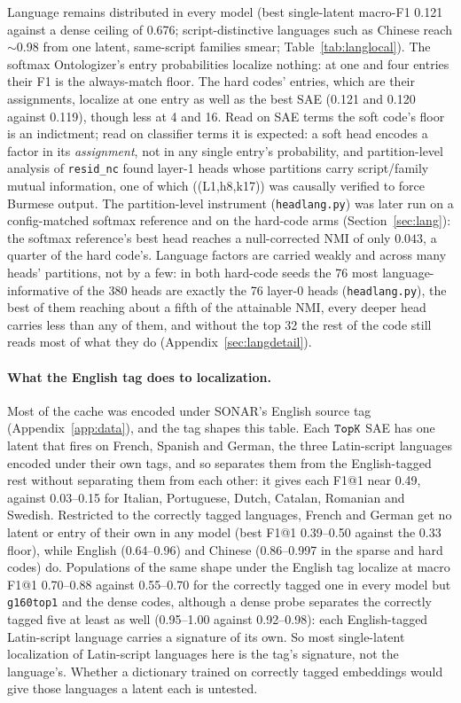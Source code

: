 Language remains distributed in every model (best single-latent macro-F1
0.121 against a dense ceiling of 0.676; script-distinctive languages such
as Chinese reach $\sim$0.98 from one latent, same-script families smear;
Table~\ref{tab:langlocal}). The softmax Ontologizer's entry probabilities
localize nothing: at one and four entries their F1 is the always-match
floor. The hard codes' entries, which are their assignments, localize at
one entry as well as the best SAE (0.121 and 0.120 against 0.119), though
less at 4 and 16. Read on SAE terms the soft code's floor is an
indictment; read on classifier terms it is expected: a soft head encodes
a factor in its \emph{assignment}, not in any single entry's probability, and partition-level
analysis of \texttt{resid\_nc} found layer-1 heads whose partitions carry
script/family mutual information, one of which ((L1,h8,k17)) was causally
verified to force Burmese output. The partition-level instrument
(\texttt{headlang.py}) was later run on a config-matched softmax
reference and on the hard-code arms (Section~\ref{sec:lang}): the softmax
reference's best head reaches a null-corrected NMI of only $0.043$, a
quarter of the hard code's. Language factors are carried weakly and
across many heads' partitions, not by a few: in both hard-code seeds the
76 most language-informative of the 380 heads are exactly the 76 layer-0
heads (\texttt{headlang.py}), the best of them reaching about a fifth of
the attainable NMI, every deeper head carries less than any of them, and
without the top 32 the rest of the code still reads most of what they do
(Appendix~\ref{sec:langdetail}).

\paragraph{What the English tag does to localization.} Most of the
cache was encoded under SONAR's English source tag
(Appendix~\ref{app:data}), and the tag shapes this table. Each $\mathop{\mathtt{TopK}}\limits$
SAE has one latent that fires on French, Spanish and German, the three
Latin-script languages encoded under their own tags, and so separates
them from the English-tagged rest without separating them from each
other: it gives each F1@1 near 0.49, against 0.03--0.15 for Italian,
Portuguese, Dutch, Catalan, Romanian and Swedish. Restricted to the
correctly tagged languages, French and German get no latent or entry of
their own in any model (best F1@1 0.39--0.50 against the 0.33 floor),
while English (0.64--0.96) and Chinese (0.86--0.997 in the sparse and
hard codes) do. Populations of the same shape under the English tag
localize at macro F1@1 0.70--0.88 against 0.55--0.70 for the correctly
tagged one in every model but \texttt{g160top1} and the dense codes,
although a dense probe separates the correctly tagged five at least as
well (0.95--1.00 against 0.92--0.98): each English-tagged Latin-script
language carries a signature of its own. So most single-latent
localization of Latin-script languages here is the tag's signature, not
the language's. Whether a dictionary trained on correctly tagged
embeddings would give those languages a latent each is untested.

